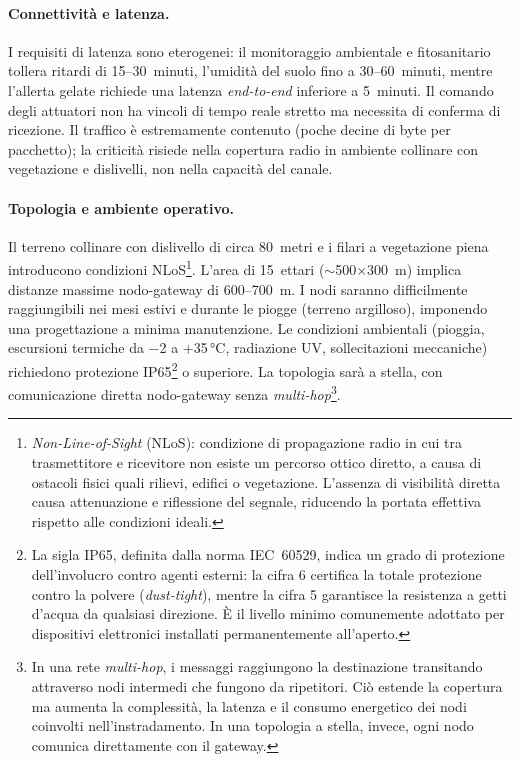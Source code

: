 \paragraph{Connettività e latenza.} I requisiti di latenza sono eterogenei: il monitoraggio ambientale e fitosanitario tollera ritardi di 15--30~minuti, l'umidità del suolo fino a 30--60~minuti, mentre l'allerta gelate richiede una latenza \textit{end-to-end} inferiore a 5~minuti. Il comando degli attuatori non ha vincoli di tempo reale stretto ma necessita di conferma di ricezione. Il traffico è estremamente contenuto (poche decine di byte per pacchetto); la criticità risiede nella copertura radio in ambiente collinare con vegetazione e dislivelli, non nella capacità del canale.

\paragraph{Topologia e ambiente operativo.} Il terreno collinare con dislivello di circa 80~metri e i filari a vegetazione piena introducono condizioni NLoS\footnote{\textit{Non-Line-of-Sight} (NLoS): condizione di propagazione radio in cui tra trasmettitore e ricevitore non esiste un percorso ottico diretto, a causa di ostacoli fisici quali rilievi, edifici o vegetazione. L'assenza di visibilità diretta causa attenuazione e riflessione del segnale, riducendo la portata effettiva rispetto alle condizioni ideali.}. L'area di 15~ettari ($\sim$500$\times$300~m) implica distanze massime nodo-gateway di 600--700~m. I nodi saranno difficilmente raggiungibili nei mesi estivi e durante le piogge (terreno argilloso), imponendo una progettazione a minima manutenzione. Le condizioni ambientali (pioggia, escursioni termiche da $-$2 a +35\,°C, radiazione UV, sollecitazioni meccaniche) richiedono protezione IP65\footnote{La sigla IP65, definita dalla norma IEC~60529, indica un grado di protezione dell'involucro contro agenti esterni: la cifra 6 certifica la totale protezione contro la polvere (\textit{dust-tight}), mentre la cifra 5 garantisce la resistenza a getti d'acqua da qualsiasi direzione. È il livello minimo comunemente adottato per dispositivi elettronici installati permanentemente all'aperto.} o superiore. La topologia sarà a stella, con comunicazione diretta nodo-gateway senza \textit{multi-hop}\footnote{In una rete \textit{multi-hop}, i messaggi raggiungono la destinazione transitando attraverso nodi intermedi che fungono da ripetitori. Ciò estende la copertura ma aumenta la complessità, la latenza e il consumo energetico dei nodi coinvolti nell'instradamento. In una topologia a stella, invece, ogni nodo comunica direttamente con il gateway.}.

